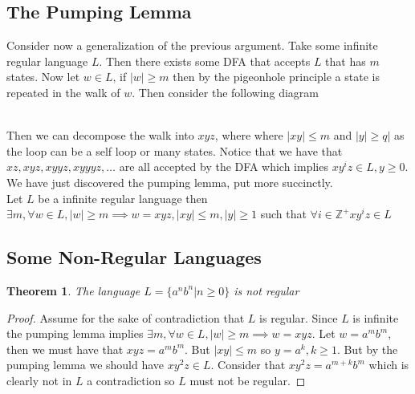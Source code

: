 \documentclass[11pt]{exam}
\newtheorem{theorem}{Theorem}[section]
\begin{document}
\subsection{The Pumping Lemma}
Consider now a generalization of the previous argument. Take some infinite regular language $L$. Then there exists some DFA that accepts $L$ that has $m$ states. Now let $w \in L$, if $|w| \geq m$ then by the pigeonhole principle a state is repeated in the walk of $w$. Then consider the following diagram\\
\\

Then we can decompose the walk into $xyz$, where where $|xy| \leq m$ and   $|y| \geq q|$ as the loop can be a self loop or many states. Notice that we have that $xz, xyz, xyyz, xyyyz, \dots$ are all accepted by the DFA which implies $xy^iz \in L, y \geq 0$. We have just discovered the pumping lemma, put more succinctly.\\

Let $L$ be a infinite regular language then $\exists m, \forall w \in L, |w| \geq m \implies w = xyz, |xy| \leq m, |y| \geq 1$ such that $\forall i \in \mathbb{Z}^+ xy^iz \in L$\\

\subsection{Some Non-Regular Languages}

\begin{theorem}
The language $L = \{a^nb^n | n \geq 0 \}$ is not regular
\end{theorem}

\begin{proof}
Assume for the sake of contradiction that $L$ is regular. Since $L$ is infinite the pumping lemma implies $\exists m, \forall w \in L, |w| \geq m \implies w = xyz$. Let $w = a^mb^m$, then we must have that $xyz = a^mb^m$. But $|xy| \leq m$ so $y = a^k, k \geq 1$. But by the pumping lemma we should have $xy^2z \in L$. Consider that $xy^2z = a^{m+k}b^m$ which is clearly not in $L$ a contradiction so $L$ must not be regular.
\end{proof}
\end{document}
